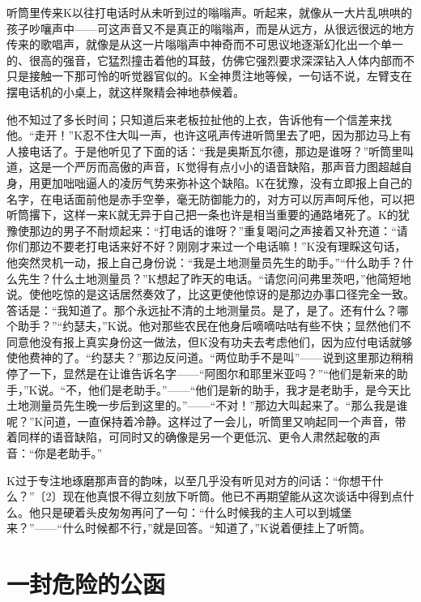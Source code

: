 \documentclass[12pt,a4paper]{article}
\begin{document}
听筒里传来K以往打电话时从未听到过的嗡嗡声。听起来，就像从一大片乱哄哄的孩子吵嚷声中——可这声音又不是真正的嗡嗡声，而是从远方，从很远很远的地方传来的歌唱声，就像是从这一片嗡嗡声中神奇而不可思议地逐渐幻化出一个单一的、很高的强音，它猛烈撞击着他的耳鼓，仿佛它强烈要求深深钻入人体内部而不只是接触一下那可怜的听觉器官似的。K全神贯注地等候，一句话不说，左臂支在摆电话机的小桌上，就这样聚精会神地恭候着。

他不知过了多长时间；只知道后来老板拉扯他的上衣，告诉他有一个信差来找他。“走开！”K忍不住大叫一声，也许这吼声传进听筒里去了吧，因为那边马上有人接电话了。于是他听见了下面的话：“我是奥斯瓦尔德，那边是谁呀？”听筒里叫道，这是一个严厉而高傲的声音，K觉得有点小小的语音缺陷，那声音力图超越自身，用更加咄咄逼人的凌厉气势来弥补这个缺陷。K在犹豫，没有立即报上自己的名字，在电话面前他是赤手空拳，毫无防御能力的，对方可以厉声呵斥他，可以把听筒撂下，这样一来K就无异于自己把一条也许是相当重要的通路堵死了。K的犹豫使那边的男子不耐烦起来：“打电话的谁呀？”重复喝问之声接着又补充道：“请你们那边不要老打电话来好不好？刚刚才来过一个电话嘛！”K没有理睬这句话，他突然灵机一动，报上自己身份说：“我是土地测量员先生的助手。”“什么助手？什么先生？什么土地测量员？”K想起了昨天的电话。“请您问问弗里茨吧，”他简短地说。使他吃惊的是这话居然奏效了，比这更使他惊讶的是那边办事口径完全一致。答话是：“我知道了。那个永远扯不清的土地测量员。是了，是了。还有什么？哪个助手？”“约瑟夫，”K说。他对那些农民在他身后嘀嘀咕咕有些不快；显然他们不同意他没有报上真实身份这一做法，但K没有功夫去考虑他们，因为应付电话就够使他费神的了。“约瑟夫？”那边反问道。“两位助手不是叫”——说到这里那边稍稍停了一下，显然是在让谁告诉名字——“阿图尔和耶里米亚吗？”“他们是新来的助手，”K说。“不，他们是老助手。”——“他们是新的助手，我才是老助手，是今天比土地测量员先生晚一步后到这里的。”——“不对！”那边大叫起来了。“那么我是谁呢？”K问道，一直保持着冷静。这样过了一会儿，听筒里又响起同一个声音，带着同样的语音缺陷，可同时又的确像是另一个更低沉、更令人肃然起敬的声音：“你是老助手。”

K过于专注地琢磨那声音的韵味，以至几乎没有听见对方的问话：“你想干什么？”〔2〕现在他真恨不得立刻放下听筒。他已不再期望能从这次谈话中得到点什么。他只是硬着头皮匆匆再问了一句：“什么时候我的主人可以到城堡来？”——“什么时候都不行，”就是回答。“知道了，”K说着便挂上了听筒。
\par{}
\newpage
\section{一封危险的公函}
\vspace{0.5em}
\vspace{0.3em}
\end{document}
